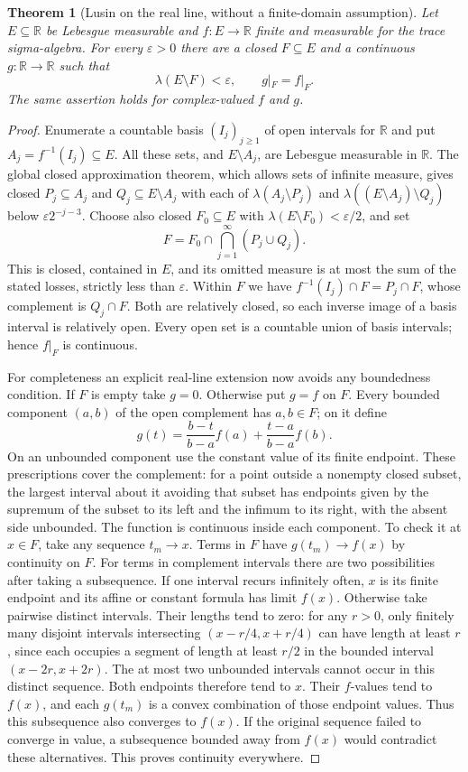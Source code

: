 \documentclass[11pt,oneside,openany]{book}
\newtheorem{theorem}{Theorem}[chapter]
\theoremstyle{definition}
\theoremstyle{remark}
\newcommand{\R}{\mathbb R}\newcommand{\C}{\mathbb C}
\newcommand{\eps}{\varepsilon}\newcommand{\ee}{\varepsilon}
\newcommand{\family}[1]{}
\begin{document}
\begin{theorem}[Lusin on the real line, without a finite-domain assumption]
\family{D11.07.lusin_real_line}\label{d11:07:lusin-real-line}
Let $E\subseteq\R$ be Lebesgue measurable and $f:E\to\R$ finite and
measurable for the trace sigma-algebra. For every $\eps>0$ there are a
closed $F\subseteq E$ and a continuous $g:\R\to\R$ such that
\[
 \lambda(E\setminus F)<\eps,\qquad g|_F=f|_F.
\]
The same assertion holds for complex-valued $f$ and $g$.
\end{theorem}
\begin{proof}
Enumerate a countable basis $(I_j)_{j\geq1}$ of open intervals for $\R$
and put $A_j=f^{-1}(I_j)\subseteq E$. All these sets, and $E\setminus A_j$,
are Lebesgue measurable in $\R$. The global closed approximation theorem,
which allows sets of infinite measure, gives closed
$P_j\subseteq A_j$ and $Q_j\subseteq E\setminus A_j$ with each of
$\lambda(A_j\setminus P_j)$ and
$\lambda((E\setminus A_j)\setminus Q_j)$ below $\eps2^{-j-3}$.
Choose also closed $F_0\subseteq E$ with
$\lambda(E\setminus F_0)<\eps/2$, and set
\[
 F=F_0\cap\bigcap_{j=1}^\infty(P_j\cup Q_j).
\]
This is closed, contained in $E$, and its omitted measure is at most the
sum of the stated losses, strictly less than $\eps$. Within $F$ we have
$f^{-1}(I_j)\cap F=P_j\cap F$, whose complement is $Q_j\cap F$.
Both are relatively closed, so each inverse image of a basis interval is
relatively open. Every open set is a countable union of basis intervals;
hence $f|_F$ is continuous.

For completeness an explicit real-line extension now avoids any boundedness
condition. If $F$ is empty take $g=0$. Otherwise put $g=f$ on $F$.
Every bounded component $(a,b)$ of the open complement has $a,b\in F$;
on it define
\[
 g(t)=\frac{b-t}{b-a}f(a)+\frac{t-a}{b-a}f(b).
\]
On an unbounded component use the constant value of its finite endpoint.
These prescriptions cover the complement: for a point outside a nonempty
closed subset, the largest interval about it avoiding that subset has
endpoints given by the supremum of the subset to its left and the infimum
to its right, with the absent side unbounded. The function is continuous
inside each component. To check it at $x\in F$, take any sequence
$t_m\to x$. Terms in $F$ have $g(t_m)\to f(x)$ by continuity on $F$.
For terms in complement intervals there are two possibilities after taking
a subsequence. If one interval recurs infinitely often, $x$ is its finite
endpoint and its affine or constant formula has limit $f(x)$. Otherwise
take pairwise distinct intervals. Their lengths tend to zero: for any
$r>0$, only finitely many disjoint intervals intersecting
$(x-r/4,x+r/4)$ can have length at least $r$, since each occupies a segment
of length at least $r/2$ in the bounded interval $(x-2r,x+2r)$.
The at most two unbounded intervals cannot occur in this distinct sequence.
Both endpoints therefore tend to $x$. Their $f$-values tend to $f(x)$,
and each $g(t_m)$ is a convex combination of those endpoint values.
Thus this subsequence also converges to $f(x)$. If the original sequence
failed to converge in value, a subsequence bounded away from $f(x)$ would
contradict these alternatives. This proves continuity everywhere.


\end{proof}
\end{document}
